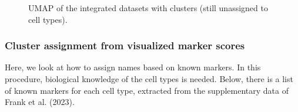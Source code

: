 \documentclass[
  letterpaper,
  DIV=11,
  numbers=noendperiod]{scrartcl}
\begin{document}
\begin{figure}[H]


\caption{\label{fig-umapleiden}UMAP of the integrated datasets with
clusters (still unassigned to cell types).}

\end{figure}%

\subsubsection{Cluster assignment from visualized marker
scores}\label{cluster-assignment-from-visualized-marker-scores}

Here, we look at how to assign names based on known markers. In this
procedure, biological knowledge of the cell types is needed. Below,
there is a list of known markers for each cell type, extracted from the
supplementary data of Frank et al. (2023).
\end{document}
